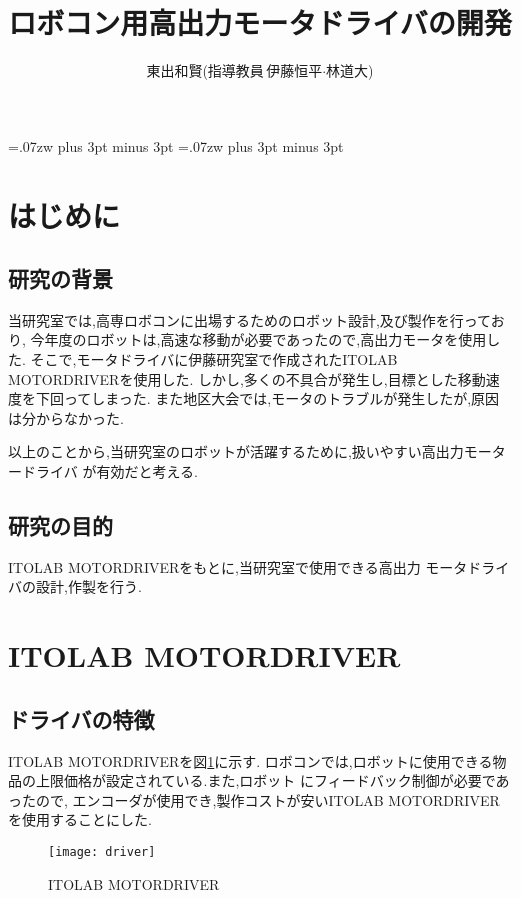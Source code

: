 \documentclass[twocolumn,11pt]{abst}
\title{ロボコン用高出力モータドライバの開発}
\author{東出和賢(指導教員\,伊藤恒平$\cdot$林道大)}
\begin{document}
\maketitle
\thispagestyle{fancy}
\pagestyle{fancy}

\setlength{\baselineskip}{5.6truemm}
\kanjiskip=.07zw plus 3pt minus 3pt
\xkanjiskip=.07zw plus 3pt minus 3pt



\section{はじめに}
\subsection{研究の背景}
当研究室では,高専ロボコンに出場するためのロボット設計,及び製作を行っており,
今年度のロボットは,高速な移動が必要であったので,高出力モータを使用した.
そこで,モータドライバに伊藤研究室で作成されたITOLAB MOTORDRIVERを使用した.
しかし,多くの不具合が発生し,目標とした移動速度を下回ってしまった.
また地区大会では,モータのトラブルが発生したが,原因は分からなかった.

以上のことから,当研究室のロボットが活躍するために,扱いやすい高出力モータードライバ
が有効だと考える.

\subsection{研究の目的}
ITOLAB MOTORDRIVERをもとに,当研究室で使用できる高出力
モータドライバの設計,作製を行う.

\section{ITOLAB MOTORDRIVER}
\subsection{ドライバの特徴}
ITOLAB MOTORDRIVERを図\ref{fig:driver}に示す.
ロボコンでは,ロボットに使用できる物品の上限価格が設定されている.また,ロボット
にフィードバック制御が必要であったので,
エンコーダが使用でき,製作コストが安いITOLAB MOTORDRIVERを使用することにした.
\begin{figure}[H]
  \begin{center}
    \texttt{[image: driver]}
    \end{center}
  \caption{ITOLAB MOTORDRIVER}
 \label{fig:driver}
\end{figure}
\end{document}
